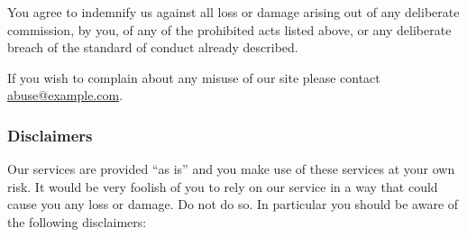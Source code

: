 You agree to indemnify us against all loss or damage arising out of any
deliberate commission, by you, of any of the prohibited acts listed
above, or any deliberate breach of the standard of conduct already
described.

If you wish to complain about any misuse of our site please contact
\href{}{{abuse@example.com}}.

\subsubsection{Disclaimers}

Our services are provided ``as is'' and you make use of these services
at your own risk. It would be very foolish of you to rely on our service
in a way that could cause you any loss or damage. Do not do so. In
particular you should be aware of the following disclaimers:

